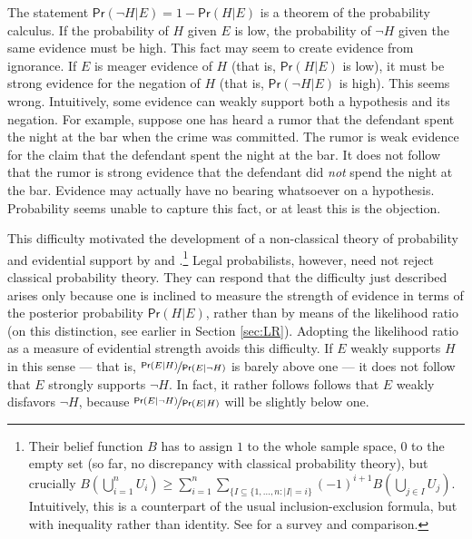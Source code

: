 \documentclass{article}
\newcommand{\pr}{\mathsf{Pr}}
\begin{document}
The statement $\pr(\neg H\vert E) = 1-\pr(H\vert E)$ is a theorem of the probability calculus. If the probability of $H$ given $E$ is low, the probability of $\neg H$ given the same evidence must be high. 
This fact may seem to create evidence from ignorance. If $E$ is meager evidence of $H$ (that is, $\pr(H \vert E)$ is low), it must be strong evidence for the negation of $H$ (that is, $\pr(\neg H \vert E)$ is high). This seems wrong. Intuitively, some evidence can weakly support both a hypothesis and its negation.  For example, suppose one has heard a rumor that the defendant spent the night at the bar when the crime was committed. The rumor is weak evidence for the claim that the defendant spent the night at the bar. It does not follow that the rumor is strong evidence that the defendant did \textit{not} spend the night at the bar. Evidence may actually have no bearing whatsoever on a hypothesis. Probability seems unable to capture this fact, or at least this is the objection.  

This difficulty motivated the development of a non-classical theory of probability and evidential support by \citet{dempster1968Generalization} and \citet{shafer1976mathematical}.\footnote{Their belief function $B$ has to assign $1$ to the whole sample space, $0$ to the empty set (so far, no discrepancy with classical probability theory), but crucially $B(\bigcup_{i=1}^nU_i) \geq \sum_{i=1}^n\sum_{\{I\subseteq \{1, \dots, n: \vert I \vert = i\}}(-1)^{i+1}B(\bigcup_{j\in I}U_j)$. Intuitively, this is a counterpart of the usual inclusion-exclusion formula, but with inequality rather than identity. See \citep{Halpern2003-HALRAU} for a survey and comparison.} 
Legal probabilists, however, need not reject classical probability theory. They can respond that the difficulty just described arises only 
because one is inclined to measure  the strength of evidence in terms of the posterior probability $\pr(H \vert E)$,  rather than by means of   the likelihood ratio (on this distinction, see earlier in Section \ref{sec:LR}). Adopting the likelihood ratio as a measure of evidential strength avoids this difficulty.
If $E$ weakly supports $H$  in this sense --- that is, $\nicefrac{\pr(E \vert H)}{\pr(E \vert \neg H)}$ is barely above one --- it does not follow that $E$ strongly supports $\neg H$. In fact, it rather follows follows that $E$ weakly disfavors $\neg H$, because $\nicefrac{\pr(E \vert \neg H)}{\pr(E \vert H)}$ will be slightly below one. 
\end{document}
